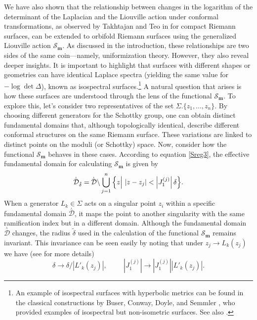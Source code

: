 \documentclass[a4paper,11pt]{article}
\newcommand{\Gpotential}{\mathscr{S}}
\newcommand{\singfund}{\overset{{}_{\curlywedge}}{\mathcal{D}}}
\begin{document}
We have also shown that the relationship between changes in the logarithm of the determinant of the Laplacian and the Liouville action under conformal transformations, as observed by Takhtajan and Teo in \cite{Takhtajan_2003} for compact Riemann surfaces, can be extended to orbifold Riemann surfaces using the generalized Liouville action $\Gpotential_{\boldsymbol{m}}$. As discussed in the introduction, these relationships are two sides of the same coin—namely, uniformization theory. However, they also reveal deeper insights. It is important to highlight that surfaces with different shapes or geometries can have identical Laplace spectra (yielding the same value for $-\log\det\Delta$), known as isospectral surfaces.\footnote{An example of isospectral surfaces with hyperbolic metrics can be found in the classical constructions by Buser, Conway, Doyle, and Semmler \cite{buser2010some}, who provided examples of isospectral but non-isometric surfaces. See also \cite{vigneras1980varietes,sunada1985riemannian,gordon1992one}.} A natural question that arises is how these surfaces are understood through the lens of the functional $\Gpotential_{\boldsymbol{m}}$. To explore this, let’s consider two representatives of the set $\Sigma.\{z_1,...,z_n\}$. By choosing different generators for the Schottky group, one can obtain distinct fundamental domains that, although topologically identical, describe different conformal structures on the same Riemann surface. These variations are linked to distinct points on the moduli (or Schottky) space. Now, consider how the functional $\Gpotential_{\boldsymbol{m}}$ behaves in these cases. According to equation \eqref{Sreg3}, the effective fundamental domain for calculating  $\Gpotential_{\boldsymbol{m}}$ is given by
\begin{equation}
\singfund_{\tilde\delta} = \singfund\backslash \bigcup_{j=1}^n \Big{\{} z\Big|~|z-z_j| < \left|J_1^{(j)}\right| \delta\Big{\}}.\label{D1}\nonumber
\end{equation}
When a generator $L_k\in\Sigma$ acts on a singular point $z_i$
within a specific fundamental domain $\singfund$, it maps the point to another singularity with the same ramification index but in a different domain. Although the fundamental domain $\singfund$ changes, the radius $\tilde\delta$ used in the calculation of the functional $\Gpotential_{\boldsymbol{m}}$ remains invariant. This invariance can be seen easily by noting that under $z_j \rightarrow L_k(z_j)$ we have (see \cite{Taghavi2024classical} for more details)
\begin{equation}
\delta \rightarrow \delta/\left|L'_k(z_j)\right|,\hspace{1cm}\left|J_{1}^{(j)}\right| \rightarrow \left|J_1^{(j)}\right| \left|L'_k(z_j)\right|.\nonumber
\end{equation}
\end{document}
